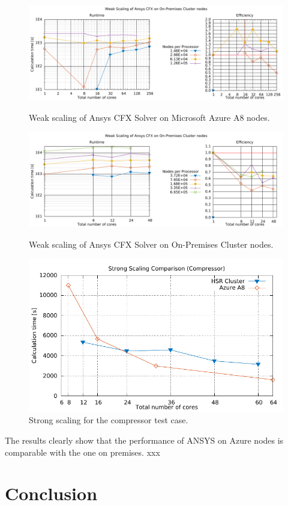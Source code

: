 \documentclass[3p,times]{elsarticle}
\begin{document}
\begin{figure}
	\centering
	\includegraphics[width=.7\linewidth]{gplt-a8-weak-pipe}	
	\label{fig:weakA8}
	\caption{Weak scaling of Ansys CFX Solver on Microsoft Azure A8 nodes. }
\end{figure}

\begin{figure}
	\centering
	\includegraphics[width=.7\linewidth]{gplt-hsr-weak-pipe}
	\label{fig:weakHSR}
	\caption{Weak scaling of Ansys CFX Solver on On-Premises Cluster nodes. }
\end{figure}



\begin{figure}
	\centering
	\includegraphics[width=0.5\linewidth]{gplt-compressor}
	\caption{Strong scaling for the compressor test case. }
	\label{fig:stringCompressor}
\end{figure}

The results clearly show that the performance of ANSYS on Azure nodes is comparable with the one on premises.
xxx


 
\section{Conclusion}
\label{sec:conclusions}
\end{document}
